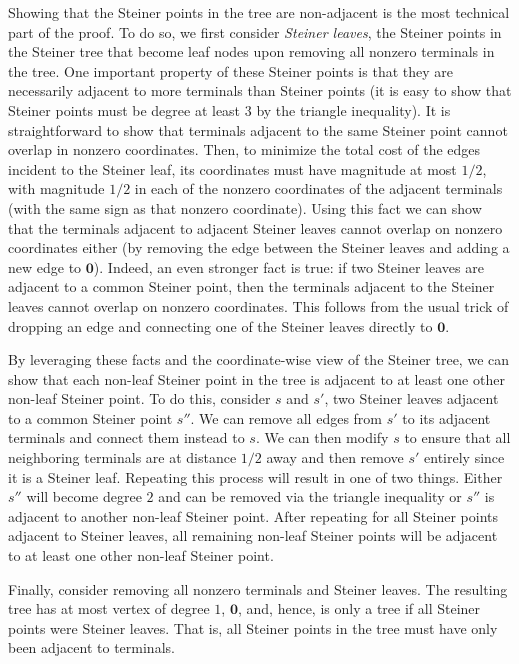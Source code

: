 \documentclass{article}\providecommand{\DeclareRedundantLanguages}[2]{}\usepackage[a4paper,margin=20mm]{geometry}
\newcommand{\1}{\textbf{1}}
\begin{document}
Showing that the Steiner points in the tree are non-adjacent is the most technical part of the proof. To do so, we first consider \textit{Steiner leaves}, the Steiner points in the Steiner tree that become leaf nodes upon removing all nonzero terminals in the tree. One important property of these Steiner points is that they are necessarily adjacent to more terminals than Steiner points (it is easy to show that Steiner points must be degree at least $3$ by the triangle inequality). It is straightforward to show that terminals adjacent to the same Steiner point cannot overlap in nonzero coordinates. Then, to minimize the total cost of the edges incident to the Steiner leaf, its coordinates must have magnitude at most $1/2$, with magnitude $1/2$ in each of the nonzero coordinates of the adjacent terminals (with the same sign as that nonzero coordinate). Using this fact we can show that the terminals adjacent to adjacent Steiner leaves cannot overlap on nonzero coordinates either (by removing the edge between the Steiner leaves and adding a new edge to $\mathbf{0}$). Indeed, an even stronger fact is true: if two Steiner leaves are adjacent to a common Steiner point, then the terminals adjacent to the Steiner leaves cannot overlap on nonzero coordinates. This follows from the usual trick of dropping an edge and connecting one of the Steiner leaves directly to $\mathbf{0}$.

By leveraging these facts and the coordinate-wise view of the Steiner tree, we can show that each non-leaf Steiner point in the tree is adjacent to at least one other non-leaf Steiner point. To do this, consider $s$ and $s'$, two Steiner leaves adjacent to a common Steiner point $s''$. We can remove all edges from $s'$ to its adjacent terminals and connect them instead to $s$. We can then modify $s$ to ensure that all neighboring terminals are at distance $1/2$ away and then remove $s'$ entirely since it is a Steiner leaf. Repeating this process will result in one of two things. Either $s''$ will become degree $2$ and can be removed via the triangle inequality or $s''$ is adjacent to another non-leaf Steiner point. After repeating for all Steiner points adjacent to Steiner leaves, all remaining non-leaf Steiner points will be adjacent to at least one other non-leaf Steiner point.

Finally, consider removing all nonzero terminals and Steiner leaves. The resulting tree has at most vertex of degree $1$, $\mathbf{0}$, and, hence, is only a tree if all Steiner points were Steiner leaves. That is, all Steiner points in the tree must have only been adjacent to terminals. 
\end{document}
